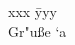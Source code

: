 \documentclass{article}
\begin{document}
\begin{tabbing}
xxx \= yyy \\
Gr\a"u\ss e \> \a`a \\
\end{tabbing}
\end{document}
